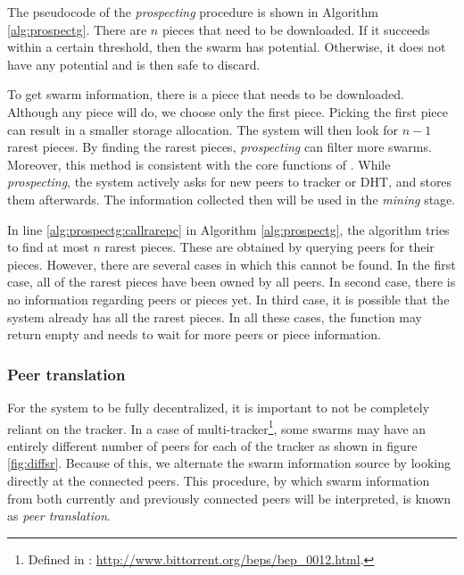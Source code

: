 The pseudocode of the \textit{prospecting} procedure is shown in Algorithm \ref{alg:prospectg}. There are $n$ pieces that need to be downloaded. If it succeeds within a certain threshold, then the swarm has potential. Otherwise, it does not have any potential and is then safe to discard. 

To get swarm information, there is a piece that needs to be downloaded. Although any piece will do, we choose only the first piece. Picking the first piece can result in a smaller storage allocation. The system will then look for $n - 1$ rarest pieces. By finding the rarest pieces, \textit{prospecting} can filter more swarms. Moreover, this method is consistent with the core functions of \bt. While \textit{prospecting}, the system actively asks for new peers to tracker or DHT, and stores them afterwards. The information collected then will be used in the \textit{mining} stage. 


In line \ref{alg:prospectg:callrarepc} in Algorithm \ref{alg:prospectg}, the algorithm tries to find  at most $n$ rarest pieces. These are obtained by querying peers for their pieces. However, there are several cases in which this cannot be found. In the first case, all of the rarest pieces have been owned by all peers. In second case, there is no information regarding peers or pieces yet. In third case, it is possible that the system already has all the rarest pieces. In all these cases, the function may return empty and needs to wait for more peers or piece information.

\subsubsection{Peer translation}
For the system to be fully decentralized, it is important to not be completely reliant on the tracker. In a case of multi-tracker\footnote{Defined in : \url{http://www.bittorrent.org/beps/bep_0012.html}.}, some swarms may have an entirely different number of peers for each of the tracker as shown in figure \ref{fig:diffsr}. Because of this, we alternate the swarm information source by looking directly at the connected peers. This procedure, by which swarm information from both currently and previously connected peers will be interpreted, is known as \textit{peer translation}. 

